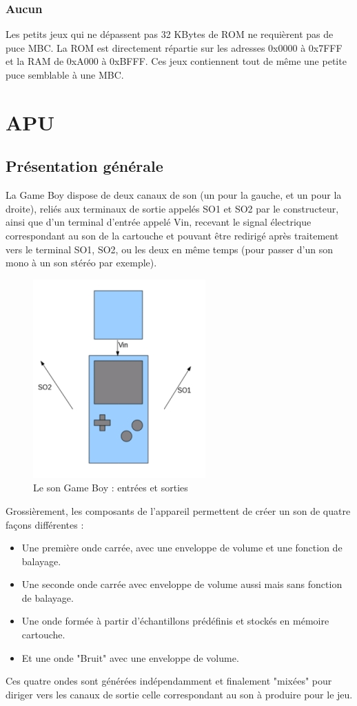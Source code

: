 \documentclass{report}
\begin{document}
\subsubsection{Aucun}
	Les petits jeux qui ne dépassent pas 32 KBytes de ROM ne requièrent pas de puce MBC. La ROM est directement répartie sur les adresses 0x0000 à 0x7FFF et la RAM de 0xA000 à 0xBFFF. Ces jeux contiennent tout de même une petite puce semblable à une MBC.\\

\section{APU}
\subsection{Présentation générale}
	La Game Boy dispose de deux canaux de son (un pour la gauche,
	et un pour la droite), reliés aux terminaux de sortie appelés
	SO1 et SO2 par le constructeur, ainsi que d'un terminal
	d'entrée appelé Vin, recevant le signal électrique
	correspondant au son de la cartouche et pouvant être redirigé après
	traitement vers le terminal SO1, SO2, ou les deux en même
	temps (pour passer d'un son mono à un son stéréo par
	exemple).
\begin{figure}[!h]
\centering
\includegraphics[scale=0.5]{images/GBSound1.jpg}
\caption{Le son Game Boy : entrées et sorties}
\label{GBS1}
\end{figure}

	Grossièrement, les composants de l'appareil permettent de
	créer un son de quatre façons différentes : 
		\begin{itemize}
		\item Une première onde carrée, avec une enveloppe de
		volume et une fonction de balayage.
		\item Une seconde onde carrée avec enveloppe de volume
		aussi mais sans fonction de balayage.
		\item Une onde formée à partir d'échantillons
		prédéfinis et stockés en mémoire cartouche.
		\item Et une onde "Bruit" avec une enveloppe de
		volume.
		\end{itemize}
	Ces quatre ondes sont générées indépendamment et finalement
	"mixées" pour diriger vers les canaux de sortie celle
	correspondant au son à produire pour le jeu.
\end{document}
